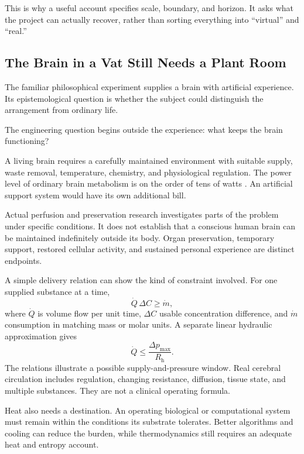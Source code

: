 \documentclass[11pt,openany]{book}
\begin{document}
This is why a useful account specifies scale, boundary, and horizon. It asks what the project can actually recover, rather than sorting everything into “virtual” and “real.”

\subsection{The Brain in a Vat Still Needs a Plant Room}

The familiar philosophical experiment supplies a brain with artificial experience. Its epistemological question is whether the subject could distinguish the arrangement from ordinary life.

The engineering question begins outside the experience: what keeps the brain functioning?

A living brain requires a carefully maintained environment with suitable supply, waste removal, temperature, chemistry, and physiological regulation. The power level of ordinary brain metabolism is on the order of tens of watts \cite{raichle2002}. An artificial support system would have its own additional bill.

Actual perfusion and preservation research investigates parts of the problem under specific conditions. It does not establish that a conscious human brain can be maintained indefinitely outside its body. Organ preservation, temporary support, restored cellular activity, and sustained personal experience are distinct endpoints.

A simple delivery relation can show the kind of constraint involved. For one supplied substance at a time,
\begin{equation}
 \dot Q\,\Delta C\geq\dot m,
\end{equation}
where $\dot Q$ is volume flow per unit time, $\Delta C$ usable concentration difference, and $\dot m$ consumption in matching mass or molar units. A separate linear hydraulic approximation gives
\begin{equation}
 \dot Q\leq\frac{\Delta p_{\max}}{R_{\mathrm h}}.
\end{equation}
The relations illustrate a possible supply-and-pressure window. Real cerebral circulation includes regulation, changing resistance, diffusion, tissue state, and multiple substances. They are not a clinical operating formula.

Heat also needs a destination. An operating biological or computational system must remain within the conditions its substrate tolerates. Better algorithms and cooling can reduce the burden, while thermodynamics still requires an adequate heat and entropy account.
\end{document}

